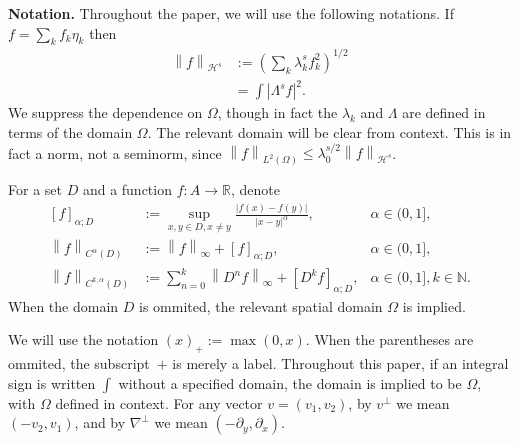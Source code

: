 \documentclass[11pt]{amsart}
\theoremstyle{remark}
\theoremstyle{definition}
\newcommand{\R}{\mathbb{R}}
\newcommand{\N}{\mathbb{N}}
\newcommand{\norm}[1]{\left\lVert#1\right\rVert}
\newcommand{\paren}[1]{\left( #1 \right)}
\newcommand{\bracket}[1]{\left[ #1 \right]}
\newcommand{\abs}[1]{\left\lvert #1 \right\rvert}
\newcommand{\del}{\partial}
\newcommand{\grad}{\nabla}
\newcommand{\eigen}[1]{\eta_{#1}} %
\newcommand{\HD}{\mathcal{H}}
\newcommand{\HDint}[2]{\int \abs{\Lambda^{#1} #2}^2}
\begin{document}




\textbf{Notation.} Throughout the paper, we will use the following notations.
If $f = \sum_k f_k \eigen{k}$ then
\begin{align*} 
\norm{f}_{\HD^s} &:= \paren{\sum_k \lambda_k^{s} f_k^2}^{1/2} 
\\ &= \HDint{s}{f}. 
\end{align*}
We suppress the dependence on $\Omega$, though in fact the $\lambda_k$ and $\Lambda$ are defined in terms of the domain $\Omega$.  The relevant domain will be clear from context.  This is in fact a norm, not a seminorm, since $\norm{f}_{L^2(\Omega)} \leq \lambda_0^{s/2} \norm{f}_{\HD^s}$.  

For a set $D$ and a function $f:A \to \R$, denote
\begin{align*}
\bracket{f}_{\alpha;D} &:= \sup_{x,y \in D, x \neq y} \frac{|f(x)-f(y)|}{|x-y|^\alpha},  &\alpha \in (0,1], \\
\norm{f}_{C^\alpha(D)} &:= \norm{f}_\infty + \bracket{f}_{\alpha;D}, & \alpha \in (0,1], \\
\norm{f}_{C^{k,\alpha}(D)} &:= \sum_{n=0}^k \norm{D^n f}_\infty + \bracket{D^k f}_{\alpha;D}, & \alpha \in (0,1], k \in \N.
\end{align*}
When the domain $D$ is ommited, the relevant spatial domain $\Omega$ is implied.  

We will use the notation $(x)_+ := \max(0,x)$.  When the parentheses are ommited, the subscript~$+$ is merely a label.  
Throughout this paper, if an integral sign is written $\int$ without a specified domain, the domain is implied to be $\Omega$, with $\Omega$ defined in context.  
For any vector $v = (v_1,v_2)$, by $v^\perp$ we mean $(-v_2,v_1)$, and by $\grad^\perp$ we mean $(-\del_y, \del_x)$.  
\end{document}
